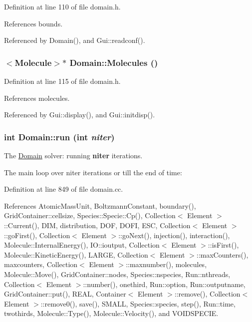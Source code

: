 Definition at line 110 of file domain.h.

References bounds.

Referenced by Domain(), and Gui::readconf().\hypertarget{classDomain_4357e15e23a5f4d81103672a3c06f8f9}{
\subsubsection[{Molecules}]{$<${\bf Molecule}$>$$\ast$ Domain::Molecules ()}}
\label{classDomain_4357e15e23a5f4d81103672a3c06f8f9}




Definition at line 115 of file domain.h.

References molecules.

Referenced by Gui::display(), and Gui::initdisp().\hypertarget{classDomain_b5cc49686f4e35fb6deb30bdfeb906e0}{
\subsubsection[{run}]{\setlength{\rightskip}{0pt plus 5cm}int Domain::run (int {\em niter})}}
\label{classDomain_b5cc49686f4e35fb6deb30bdfeb906e0}


The \hyperlink{classDomain}{Domain} solver: running {\bf niter} iterations. 



The main loop over niter iterations or till the end of time: 

Definition at line 849 of file domain.cc.

References AtomicMassUnit, BoltzmannConstant, boundary(), GridContainer::cellsize, Species::Specie::Cp(), Collection$<$ Element $>$::Current(), DIM, distribution, DOF, DOFI, ESC, Collection$<$ Element $>$::goFirst(), Collection$<$ Element $>$::goNext(), injection(), interaction(), Molecule::InternalEnergy(), IO::ioutput, Collection$<$ Element $>$::isFirst(), Molecule::KineticEnergy(), LARGE, Collection$<$ Element $>$::maxCounters(), maxcounters, Collection$<$ Element $>$::maxnumber(), molecules, Molecule::Move(), GridContainer::nodes, Species::nspecies, Run::nthreads, Collection$<$ Element $>$::number(), onethird, Run::option, Run::outputname, GridContainer::put(), REAL, Container$<$ Element $>$::remove(), Collection$<$ Element $>$::remove0(), save(), SMALL, Species::species, step(), Run::time, twothirds, Molecule::Type(), Molecule::Velocity(), and VOIDSPECIE.

